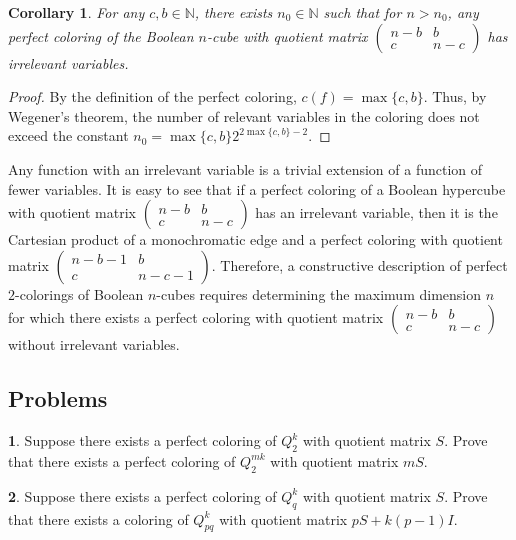 \documentclass[11pt]{article}
\newtheorem{corollary}{Corollary}[section]
\theoremstyle{definition}
\newtheorem{exercise}{\quad}
\begin{document}
\begin{corollary}
For any $c,b\in \mathbb{N}$, there exists $n_0\in \mathbb{N}$ such that for $n> n_0$, any perfect coloring of the Boolean $n$-cube with
quotient matrix $\begin{pmatrix}
n-b & b \\
c & n-c
\end{pmatrix}$ has irrelevant variables. \end{corollary}
\begin{proof}
By the definition of the perfect coloring, $c(f)=\max\{c,b\}$.
Thus, by Wegener's theorem, the number of relevant variables
in the coloring does not exceed the constant
$n_0=\max\{c,b\}2^{2\max\{c,b\}-2}$.
\end{proof}

Any function with an irrelevant variable is a trivial extension of a function of fewer variables.
 It is easy to see that if a perfect coloring of a Boolean
hypercube with quotient matrix $\begin{pmatrix}
n-b & b \\
c & n-c
\end{pmatrix}$ has an irrelevant variable, then it is
 the Cartesian product of a monochromatic edge and a perfect
coloring with quotient matrix $\begin{pmatrix}
n-b-1 & b \\
c & n-c-1
\end{pmatrix}$. 
Therefore, a constructive description of perfect $2$-colorings of Boolean $n$-cubes requires determining the maximum dimension $n$ for which there exists a perfect coloring with quotient matrix
$\begin{pmatrix}
n-b & b \\
c & n-c
\end{pmatrix}$  without irrelevant variables.

\subsection{Problems}

\begin{exercise}
Suppose there exists a perfect coloring of $Q_2^k$ with
quotient matrix $S$. Prove that there exists a perfect coloring of $Q_2^{mk}$ with quotient matrix $mS$.
\end{exercise}

\begin{exercise}
Suppose there exists a perfect coloring of  $Q_q^k$ with quotient matrix
$S$. Prove that there exists a coloring of
$Q_{pq}^{k}$ with quotient matrix $pS+k(p-1)I$.
\end{exercise}
\end{document}
